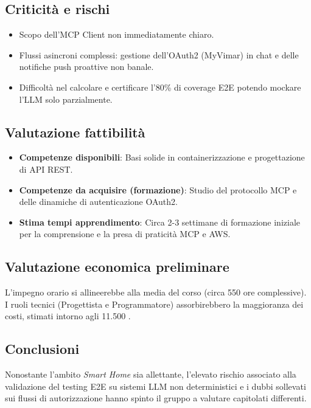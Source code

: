 \documentclass[a4paper, 11pt]{article}
\begin{document}
\subsection{Criticità e rischi}
\begin{itemize}[label=-]
    \item Scopo dell'MCP Client non immediatamente chiaro.
    \item Flussi asincroni complessi: gestione dell'OAuth2 (MyVimar) in chat e delle notifiche push proattive non banale.
    \item Difficoltà nel calcolare e certificare l'80\% di coverage E2E potendo mockare l'LLM solo parzialmente.
\end{itemize}

\subsection{Valutazione fattibilità}
\begin{itemize}[label=-]
    \item \textbf{Competenze disponibili}: Basi solide in containerizzazione e progettazione di API REST.
    \item \textbf{Competenze da acquisire (formazione)}: Studio del protocollo MCP e delle dinamiche di autenticazione OAuth2.
    \item \textbf{Stima tempi apprendimento}: Circa 2-3 settimane di formazione iniziale per la comprensione e la presa di praticità MCP e AWS.
\end{itemize}

\subsection{Valutazione economica preliminare}
L'impegno orario si allineerebbe alla media del corso (circa 550 ore complessive). I ruoli tecnici (Progettista e Programmatore) assorbirebbero la maggioranza dei costi, stimati intorno agli 11.500 \texteuro.

\subsection{Conclusioni}
Nonostante l'ambito \textit{Smart Home} sia allettante, l'elevato rischio associato alla validazione del testing E2E su sistemi LLM non deterministici e i dubbi sollevati sui flussi di autorizzazione hanno spinto il gruppo a valutare capitolati differenti.

\end{document}
